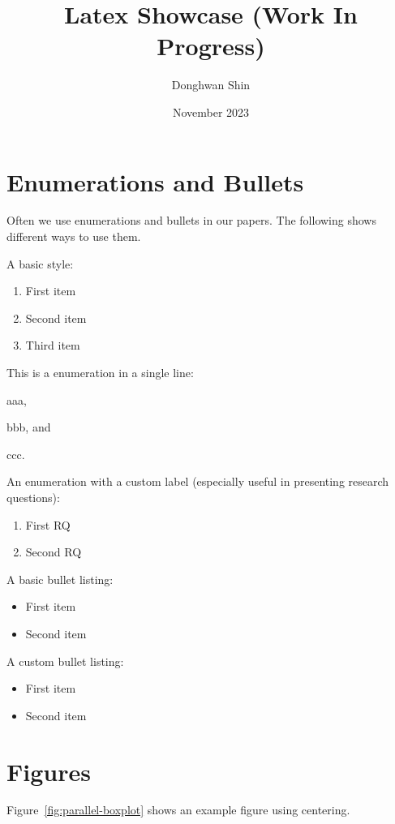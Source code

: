 \documentclass{article}
\title{Latex Showcase (Work In Progress)}
\author{Donghwan Shin}
\date{November 2023}
\theoremstyle{definition}
\begin{document}
\maketitle

\section{Enumerations and Bullets}
Often we use enumerations and bullets in our papers. The following shows different ways to use them.

A basic style:
\begin{enumerate}
    \item First item
    \item Second item
    \item Third item
\end{enumerate}

This is a enumeration in a single line: 
\begin{inparaenum}[(1)]
    \item aaa,
    \item bbb, and
    \item ccc.
\end{inparaenum}

An enumeration with a custom label (especially useful in presenting research questions):
\begin{enumerate}[\bf RQ1]
    \item First RQ
    \item Second RQ
\end{enumerate}

A basic bullet listing:
\begin{itemize}
    \item First item
    \item Second item
\end{itemize}

A custom bullet listing:
\begin{itemize}[-]
    \item First item
    \item Second item
\end{itemize}


\section{Figures}

Figure~\ref{fig:parallel-boxplot} shows an example figure using centering.
\end{document}
